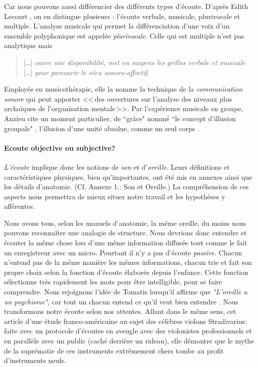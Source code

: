 Car nous pouvons aussi différencier des différents types d'écoute. D'après Edith Lecourt \autocite [182] {lecourt:decouvrir},
on en distingue plusieurs : l'écoute verbale, musicale, plurivocale et multiple.
 L'analyse musicale qui permet la différenciation d'une voix d'un ensemble polyphonique est appelée \emph{plurivocale}. Celle qui est multiple n'est pas analytique  mais
 \begin{quote}
 	 [\ldots] \textit{ouvre une disponibilité, met en suspens les grilles verbale et musicale} [\ldots] \emph{pour parcourir le vécu sonoro-affectif}\autocite[183]{lecourt:decouvrir}.
 \end{quote}
 Employée en musicothérapie, elle la nomme la technique de la  \emph{communication sonore} qui peut apporter
 <<\,des ouvertures sur l'analyse des niveaux plus archaïques de l'organisation mentale\,>>\autocite[154]{lecourt:decouvrir}.
 Par l'expérience musicale en groupe, Anzieu cite un moment
 particulier, de ``grâce"  nommé ``le concept d'illusion groupale" \autocite[113]{AnzieuMoiPeau},
 l'illusion d'une unité absolue, comme un seul corps .








\paragraph{Ecoute objective ou subjective?}

\emph{L'écoute} implique donc les notions de \emph{son} et
d'\emph{oreille}. Leurs définitions et caractéristiques physiques, bien qu'importantes, ont été mis en
annexes ainsi que les détails
d'anatomie. (Cf. Annexe 1.: Son et Oreille.)
La compréhension de ces aspects nous
permettra de mieux situer notre travail et les hypothèses y afférentes.


Nous avons tous,
selon les manuels d'anatomie, la même
oreille, du moins nous pouvons reconnaître une analogie de structure. Nous devrions donc entendre et écouter la même chose
lors d'une même information diffusée tout comme le fait un enregistreur avec un micro. Pourtant il n'y a pas d'écoute \emph{passive}. Chacun n'entend pas de la même manière les mêmes
informations, chacun trie et fait son propre choix selon la fonction
d'écoute élaborée depuis l'enfance. Cette fonction sélectionne très
rapidement les mots pour être intelligible, pour se faire
comprendre. Nous rejoignons l'idée de Tomatis lorsqu'il affirme que
\textit{"L'oreille a un psychisme"}, car tout un chacun entend ce qu'il veut bien
entendre \autocite [167]{tomatis_oreille_1987}.
Nous transformons notre écoute selon nos attentes.
Allant dans le même sens, cet
article d'une
étude franco-américaine \autocite{lemonde.fr:stradivarius} au sujet des célèbres violons
Stradivarius: faite avec un protocole
d'écoutes en aveugle avec
des violonistes professionnels et en parallèle avec un public (caché
derrière un rideau), elle démontre que le mythe de la suprématie
de ces instruments extrêmement chers tombe au profit d'instruments
neufs.

